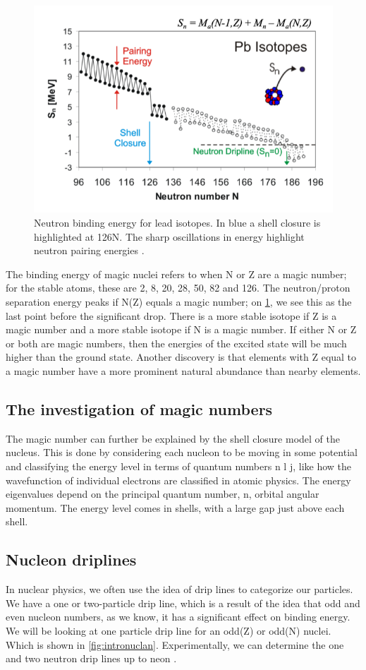 \begin{figure}[H]
    \centering
    \includegraphics[width=.5\textwidth]{images/NMMwrtNFT_zigzag.png}
    \caption{Neutron binding energy for lead isotopes. In blue a shell closure is highlighted at 126N. The sharp oscillations in energy highlight neutron pairing energies \cite{noauthor_nuclear_nodate}.}\label{fig:MSaNFTzigzag}
\end{figure}

The binding energy of magic nuclei refers to when N or Z are a magic number; for the stable atoms, these are 2, 8, 20, 28, 50, 82 and 126.
The neutron/proton separation energy peaks if N(Z) equals a magic number; on \cref{fig:MSaNFTzigzag}, we see this as the last point before the significant drop.
There is a more stable isotope if Z is a magic number and a more stable isotope if N is a magic number.
If either N or Z or both are magic numbers, then the energies of the excited state will be much higher than the ground state.
Another discovery is that elements with Z equal to a magic number have a more prominent natural abundance than nearby elements. \cite{kumawat_description_2018}

\subsection{The investigation of magic numbers}
The magic number can further be explained by the shell closure model of the nucleus.
This is done by considering each nucleon to be moving in some potential and classifying the energy level in terms of quantum numbers n l j, like how the wavefunction of individual electrons are classified in atomic physics.
The energy eigenvalues depend on the principal quantum number, n, orbital angular momentum.
The energy level comes in shells, with a large gap just above each shell. \cite{heyde_nuclear_1994}

\subsection{Nucleon driplines}
In nuclear physics, we often use the idea of drip lines to categorize our particles.
We have a one or two-particle drip line, which is a result of the idea that odd and even nucleon numbers, as we know, it has a significant effect on binding energy.
We will be looking at one particle drip line for an odd(Z) or odd(N) nuclei. Which is shown in \cref{fig:intronuclan}.
Experimentally, we can determine the one and two neutron drip lines up to neon \cite{smolanczuk_particle}.